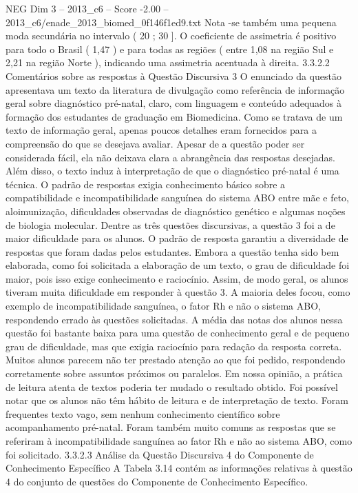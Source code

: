 \begin{textsample}{NEG Dim 3 – 2013\_c6 – Score -2.00 – 2013\_c6/enade\_2013\_biomed\_0f146f1ed9.txt}
Nota -se também uma pequena moda secundária no intervalo ( 20 ; 30 ].
O coeficiente de assimetria é positivo para todo o Brasil ( 1,47 ) e para todas as regiões ( entre 1,08 na região Sul e 2,21 na região Norte ), indicando uma assimetria acentuada à direita. 3.3.2.2 Comentários sobre as respostas à Questão Discursiva 3 O enunciado da questão apresentava um texto da literatura de divulgação como referência de informação geral sobre diagnóstico pré-natal, claro, com linguagem e conteúdo adequados à formação dos estudantes de graduação em Biomedicina.
Como se tratava de um texto de informação geral, apenas poucos detalhes eram fornecidos para a compreensão do que se desejava avaliar.
Apesar de a questão poder ser considerada fácil, ela não deixava clara a abrangência das respostas desejadas.
Além disso, o texto induz à interpretação de que o diagnóstico pré-natal é uma técnica.
O padrão de respostas exigia conhecimento básico sobre a compatibilidade e incompatibilidade sanguínea do sistema ABO entre mãe e feto, aloimunização, dificuldades observadas de diagnóstico genético e algumas noções de biologia molecular.
Dentre as três questões discursivas, a questão 3 foi a de maior dificuldade para os alunos.
O padrão de resposta garantiu a diversidade de respostas que foram dadas pelos estudantes.
Embora a questão tenha sido bem elaborada, como foi solicitada a elaboração de um texto, o grau de dificuldade foi maior, pois isso exige conhecimento e raciocínio.
Assim, de modo geral, os alunos tiveram muita dificuldade em responder à questão 3.
A maioria deles focou, como exemplo de incompatibilidade sanguínea, o fator Rh e não o sistema ABO, respondendo errado às questões solicitadas.
A média das notas dos alunos nessa questão foi bastante baixa para uma questão de conhecimento geral e de pequeno grau de dificuldade, mas que exigia raciocínio para redação da resposta correta.
Muitos alunos parecem não ter prestado atenção ao que foi pedido, respondendo corretamente sobre assuntos próximos ou paralelos.
Em nossa opinião, a prática de leitura atenta de textos poderia ter mudado o resultado obtido.
Foi possível notar que os alunos não têm hábito de leitura e de interpretação de texto.
Foram frequentes texto vago, sem nenhum conhecimento científico sobre acompanhamento pré-natal.
Foram também muito comuns as respostas que se referiram à incompatibilidade sanguínea ao fator Rh e não ao sistema ABO, como foi solicitado. 3.3.2.3 Análise da Questão Discursiva 4 do Componente de Conhecimento Específico A Tabela 3.14 contém as informações relativas à questão 4 do conjunto de questões do Componente de Conhecimento Específico.

\end{textsample}
